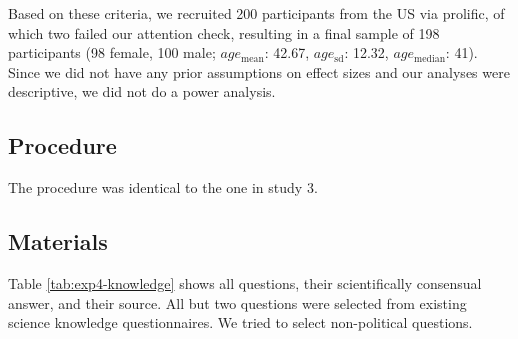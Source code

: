 \documentclass[
  doc,floatsintext]{apa6}
\begin{document}
Based on these criteria, we recruited 200 participants from the US via prolific, of which two failed our attention check, resulting in a final sample of 198 participants (98 female, 100 male; \(age_\text{mean}\): 42.67, \(age_\text{sd}\): 12.32, \(age_\text{median}\): 41). Since we did not have any prior assumptions on effect sizes and our analyses were descriptive, we did not do a power analysis.

\subsection{Procedure}\label{procedure-3}

The procedure was identical to the one in study 3.

\subsection{Materials}\label{materials-5}

\FloatBarrier

Table \ref{tab:exp4-knowledge} shows all questions, their scientifically consensual answer, and their source. All but two questions were selected from existing science knowledge questionnaires. We tried to select non-political questions.

\begingroup\fontsize{8}{10}\selectfont
\end{document}
